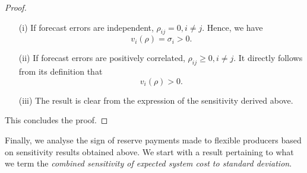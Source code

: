 \documentclass{article}
\begin{document}
\begin{proof}
\begin{itemize}
\item[(i)] If forecast errors are independent, $\rho_{ij} = 0, i \ne j$. Hence, we have
\begin{equation*}
v_{i}(\rho) = \sigma_i > 0.
\end{equation*}
\item[(ii)] If forecast errors are positively correlated, $\rho_{ij} \ge 0, i \ne j$. It directly follows from its definition that 
\begin{equation*}
v_{i}(\rho) > 0.
\end{equation*}
\item[(iii)] The result is clear from the expression of the sensitivity derived above.
\end{itemize}
This concludes the proof.
\end{proof}

Finally, we analyse the sign of reserve payments made to flexible producers based on sensitivity results obtained above. We start with a result pertaining to what we term the \textit{combined sensitivity of expected system cost to standard deviation}.
\end{document}
